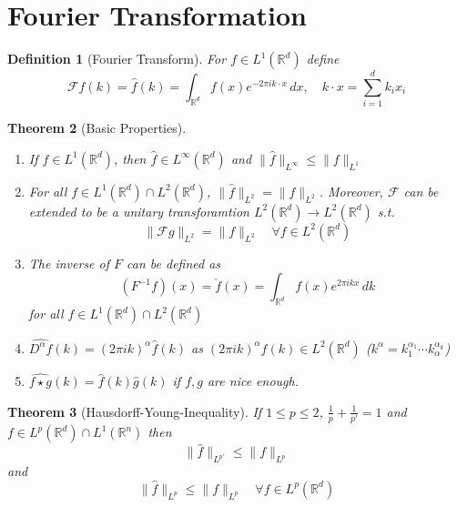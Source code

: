 \documentclass{report}
\theoremstyle{tommy}
\newtheorem{defn}{Definition}
\newtheorem{thm}[defn]{Theorem}
\newcommand{\four}{\mathcal{F}}
\begin{document}
  \section{Fourier Transformation}
  \begin{defn}[Fourier Transform]
    For \(f \in L^1(\mathbb{R}^d)\) define
    \[\four f(k) = \hat f(k) = \int_{\mathbb{R}^d} f(x) e^{- 2 \pi i k \cdot x} \, dx, \quad k\cdot x = \sum_{i=1}^d k_i x_i\]
  \end{defn}

  
  \begin{thm}[Basic Properties]
    \begin{enumerate}
      \item If \(f \in L^1(\mathbb{R}^d)\), then \(\hat f \in L^\infty(\mathbb{R}^d)\) and \(\| \hat f \|_{L^\infty} \le \|f\|_{L^1}\)
      \item For all \(f \in L^1(\mathbb{R}^d) \cap L^2(\mathbb{R}^d)\), \(\|\hat f\|_{L^2} = \|f\|_{L^2}\). Moreover, \(\four\) can be extended to be a unitary transforamtion \(L^2(\mathbb{R}^d) \to L^2(\mathbb{R}^d)\) s.t.
      \[\|\four g\|_{L^2} = \|f\|_{L^2} \quad \forall f \in L^2(\mathbb{R}^d)\]
      \item The inverse of \(F\) can be defined as
      \[(F^{-1}f)(x) = \check f (x) = \int_{\mathbb{R}^d} f(x) e^{2 \pi ik x} \, dk\] for all \(f \in L^1(\mathbb{R}^d) \cap L^2(\mathbb{R}^d)\)
      \item \(\widehat{D^\alpha f}(k) = (2 \pi i k)^\alpha \hat f(k)\) as \((2 \pi ik)^\alpha f(k) \in L^2(\mathbb{R}^d)\) (\(k^\alpha = k_1^{\alpha_1} \cdots k_\alpha^{\alpha_k}\))
      \item \(\widehat{f \star g}(k) = \hat f(k) \hat g (k)\) if \(f,g\) are nice enough.
    \end{enumerate}
  \end{thm}

  \begin{thm}[Hausdorff-Young-Inequality]\label{hausdorff-young}
    If \(1 \le p \le 2\), \(\frac{1}{p} + \frac{1}{p'} = 1\) and \(f \in L^p(\mathbb{R}^d) \cap L^1(\mathbb{R}^n)\) then
    \[\| \hat f \|_{L^{p'}} \le \|f\|_{L^p}\]
    and 
    \[\|\hat f\|_{L^p} \le \|f\|_{L^p} \quad \forall f \in L^p(\mathbb{R}^d)\]
  \end{thm}
  
\end{document}
